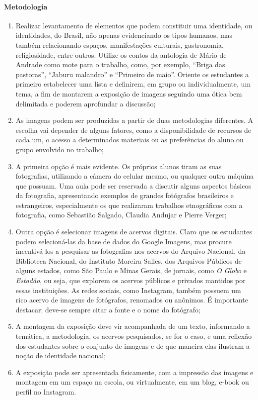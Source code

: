 \documentclass{article}
\begin{document}
\paragraph{Metodologia} 
\begin{enumerate}
\item
Realizar levantamento de elementos que podem
constituir uma identidade, ou identidades, do Brasil, não apenas
evidenciando os tipos humanos, mas também relacionando espaços,
manifestações culturais, gastronomia, religiosidade, entre outros.
Utilize os contos da antologia de Mário de Andrade como mote para o
trabalho, como, por exemplo, ``Briga das pastoras'', ``Jaburu malandro''
e ``Primeiro de maio''. Oriente os estudantes a primeiro estabelecer uma
lista e definirem, em grupo ou individualmente, um tema, a fim de
montarem a exposição de imagens seguindo uma ótica bem delimitada e
poderem aprofundar a discussão;

\item As imagens podem ser produzidas a partir de duas metodologias
diferentes. A escolha vai depender de alguns fatores, como a
disponibilidade de recursos de cada um, o acesso a determinados
materiais ou as preferências do aluno ou grupo envolvido no trabalho;

\item A primeira opção é mais evidente. Os próprios alunos tiram as suas
fotografias, utilizando a câmera do celular mesmo, ou qualquer outra
máquina que possuam. Uma aula pode ser reservada a discutir alguns
aspectos básicos da fotografia, apresentando exemplos de grandes
fotógrafos brasileiros e estrangeiros, especialmente os que realizaram
trabalhos etnográficos com a fotografia, como Sebastião Salgado, Claudia
Andujar e Pierre Verger;

\item Outra opção é selecionar imagens de acervos digitais. Claro que os
estudantes podem selecioná-las da base de dados do Google Imagens, mas
procure incentivá-los a pesquisar as fotografias nos acervos do Arquivo
Nacional, da Biblioteca Nacional, do Instituto Moreira Salles, dos
Arquivos Públicos de alguns estados, como São Paulo e Minas Gerais, de
jornais, como \emph{O Globo} e \emph{Estadão}, ou seja, que explorem os
acervos públicos e privados mantidos por essas instituições. As redes
sociais, como Instagram, também possuem um rico acervo de imagens de
fotógrafos, renomados ou anônimos. É importante destacar: deve-se sempre
citar a fonte e o nome do fotógrafo;

\item A montagem da exposição deve vir acompanhada de um texto, informando
a temática, a metodologia, os acervos pesquisados, se for o caso, e uma
reflexão dos estudantes sobre o conjunto de imagens e de que maneira
elas ilustram a noção de identidade nacional;

\item A exposição pode ser apresentada fisicamente, com a impressão das
imagens e montagem em um espaço na escola, ou virtualmente, em um blog,
e-book ou perfil no Instagram.
\end{enumerate}
\end{document}
